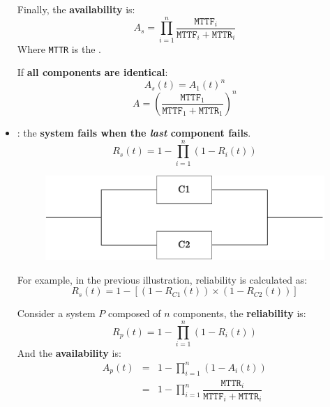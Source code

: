 \begin{itemize}
    Finally, the \textbf{availability} is:
    \begin{equation}
        A_{s} = \prod_{i=1}^{n} \dfrac{\texttt{MTTF}_{i}}{\texttt{MTTF}_{i} + \texttt{MTTR}_{i}}
    \end{equation}
    Where \texttt{MTTR} is the .

    If \textbf{all components are identical}:
    \begin{equation}
        A_{s}\left(t\right) = A_{1}\left(t\right)^{n}
    \end{equation}
    \begin{equation}
        A = \left(\dfrac{
            \texttt{MTTF}_{1}
        }{
            \texttt{MTTF}_{1} + \texttt{MTTR}_{1}
        }\right)^{n}
    \end{equation}


    \item {}: the \textbf{system fails when the \emph{last} component fails}.
    \begin{equation}
        R_{s}\left(t\right) = 1 - \prod_{i=1}^{n} \left(1 - R_{i}\left(t\right)\right)
    \end{equation}
    \begin{figure}[!htp]
        \centering
        \includegraphics[width=.8\textwidth]{img/RBD-2.pdf}
    \end{figure}

    For example, in the previous illustration, reliability is calculated as:
    \begin{equation*}
        R_{s}\left(t\right) = 1 - \left[\left(1-R_{C1}\left(t\right)\right) \times \left(1-R_{C2}\left(t\right)\right)\right]
    \end{equation*}

    Consider a system $P$ composed of $n$ components, the \textbf{reliability} is:
    \begin{equation}
        R_{p}\left(t\right) = 1 - \prod_{i=1}^{n} \left(1 - R_{i}\left(t\right)\right)
    \end{equation}
    And the \textbf{availability} is:
    \begin{equation}
        \begin{array}{rcl}
            A_{p}\left(t\right) &=& 1 - \displaystyle\prod_{i=1}^{n} \left(1 - A_{i}\left(t\right)\right) \\ [1em]
            &=& 1 - \displaystyle\prod_{i=1}^{n} \dfrac{\texttt{MTTR}_{i}}{\texttt{MTTF}_{i} + \texttt{MTTR}_{i}}
        \end{array}
    \end{equation}
\end{itemize}
